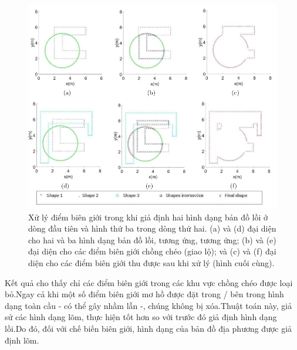 \documentclass[11pt,openany]{book}
\begin{document}
\begin{figure}[H]
    \centering
    \includegraphics[scale=0.4]{assets/3_7.png}
    \caption{Xử lý điểm biên giới trong khi giả định hai hình dạng bản đồ lồi ở dòng đầu tiên và hình thứ ba trong dòng thứ hai. (a) và (d) đại diện cho hai và ba hình dạng bản đồ lồi, tương ứng, tương ứng; (b) và (e) đại diện cho các điểm biên giới chồng chéo (giao lộ); và (c) và (f) đại diện cho các điểm biên giới thu được sau khi xử lý (hình cuối cùng).}
    \label{fig:3.7}
\end{figure}
Kết quả cho thấy chỉ các điểm biên giới trong các khu vực chồng chéo được loại bỏ.Ngay cả khi một số điểm biên giới mơ hồ được đặt trong / bên trong hình dạng toàn cầu - có thể gây nhầm lẫn -, chúng không bị xóa.Thuật toán này, giả sử các hình dạng lõm, thực hiện tốt hơn so với trước đó giả định hình dạng lồi.Do đó, đối với chế biến biên giới, hình dạng của bản đồ địa phương được giả định lõm.
\end{document}

